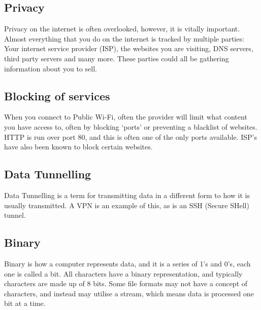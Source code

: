 \subsection{Privacy}
Privacy on the internet is often overlooked, however, it is vitally important\cite{privacyrulez}. Almost everything that you do on the internet is tracked by multiple parties: Your internet service provider (ISP), the websites you are visiting, DNS servers, third party servers and many more. These parties could all be gathering information about you to sell.

\subsection{Blocking of services}
When you connect to Public Wi-Fi, often the provider will limit what content you have access to, often by blocking `ports' or preventing a blacklist of websites.\\
HTTP is run over port 80, and this is often one of the only ports available. ISP's have also been known to block certain websites.

\subsection{Data Tunnelling}
Data Tunnelling is a term for transmitting data in a different form to how it is usually transmitted. A VPN is an example of this, as is an SSH (Secure SHell) tunnel.

\subsection{Binary}
Binary is how a computer represents data, and it is a series of 1's and 0's, each one is called a bit.
All characters have a binary representation, and typically characters are made up of 8 bits. Some file formats may not have a concept of characters, and instead may utilise a stream, which means data is processed one bit at a time.

